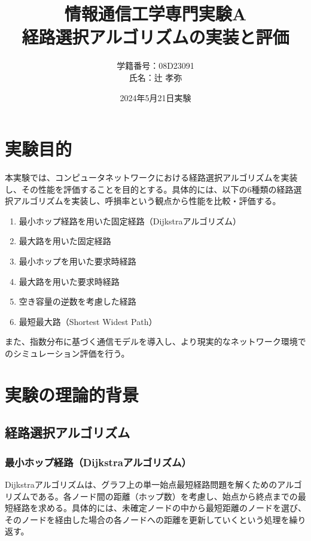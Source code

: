 \documentclass[a4paper,11pt]{jsarticle}
\begin{document}
\title{情報通信工学専門実験A \\ 経路選択アルゴリズムの実装と評価}
\author{学籍番号：08D23091 \\ 氏名：辻 孝弥}
\date{2024年5月21日実験}
\maketitle

\section{実験目的}
本実験では、コンピュータネットワークにおける経路選択アルゴリズムを実装し、その性能を評価することを目的とする。具体的には、以下の6種類の経路選択アルゴリズムを実装し、呼損率という観点から性能を比較・評価する。
\begin{enumerate}
  \item 最小ホップ経路を用いた固定経路（Dijkstraアルゴリズム）
  \item 最大路を用いた固定経路
  \item 最小ホップを用いた要求時経路
  \item 最大路を用いた要求時経路
  \item 空き容量の逆数を考慮した経路
  \item 最短最大路（Shortest Widest Path）
\end{enumerate}

また、指数分布に基づく通信モデルを導入し、より現実的なネットワーク環境でのシミュレーション評価を行う。

\section{実験の理論的背景}

\subsection{経路選択アルゴリズム}

\subsubsection{最小ホップ経路（Dijkstraアルゴリズム）}
Dijkstraアルゴリズムは、グラフ上の単一始点最短経路問題を解くためのアルゴリズムである。各ノード間の距離（ホップ数）を考慮し、始点から終点までの最短経路を求める。具体的には、未確定ノードの中から最短距離のノードを選び、そのノードを経由した場合の各ノードへの距離を更新していくという処理を繰り返す。
\end{document}
